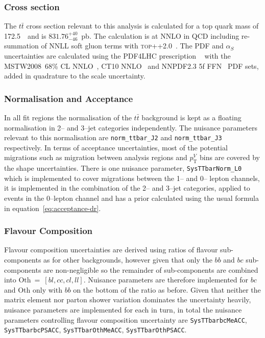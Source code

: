 \subsubsection{Cross section}

The $t\bar{t}$ cross section relevant to this analysis is calculated for a top
quark mass of 172.5~\GeV\ and is $831.76^{+40}_{-46}$~pb. The calculation is  at
NNLO in QCD including re-summation of NNLL soft gluon terms with
\textsc{top++2.0}~\cite{Beneke2012695,Cacciari2012612,PhysRevLett.109.132001,NNLOcorr,NNLOcorrNLO,PhysRevLett.110.252004,Czakon:2011xx}.
The PDF and $\alpha_S$ uncertainties are calculated using the PDF4LHC
prescription ~\cite{Botje:2011sn} with the MSTW2008~68\% CL
NNLO~\cite{PDFLHC,alphasunc}, CT10
NNLO~\cite{PhysRevD.82.074024,PhysRevD.89.033009} and NNPDF2.3 5f
FFN~\cite{Ball:2012cx} PDF sets, added in quadrature to the scale uncertainty.

\subsubsection{Normalisation and Acceptance}

In all fit regions the normalisation of the $t\bar{t}$ background is kept as a
floating normalisation in 2-- and 3--jet categories independently. The nuisance
parameters relevant to this normalisation are \texttt{norm\_ttbar\_J2} and
\texttt{norm\_ttbar\_J3} respectively. In terms of acceptance uncertainties,
most of the potential migrations such as migration between analysis regions and
$p_{\mathrm{T}}^V$ bins are covered by the shape uncertainties. There is one nuisance
parameter, \texttt{SysTTbarNorm\_L0} which is implemented to cover migrations
between the 1-- and 0-- lepton channels, it is implemented in the combination of
the 2-- and 3--jet categories, applied to events in the 0--lepton channel and
has a prior calculated using the usual formula in
equation~\ref{eq:acceptance-dr}.

\subsubsection{Flavour Composition}

Flavour composition uncertainties are derived using ratios of flavour
sub-components as for other backgrounds, however given that only the $bb$ and
$bc$ sub-components are non-negligible so the remainder of sub-components are
combined into $\text{Oth}~=~[bl, cc, cl, ll]$. Nuisance parameters are therefore
implemented for $bc$ and Oth only with $bb$ on the bottom of the ratio as
before. Given that neither the matrix element nor parton shower variation
dominates the uncertainty heavily, nuisance parameters are implemented for each
in turn, in total the nuisance parameters controlling flavour composition
uncertainty are \texttt{SysTTbarbcMeACC}, \texttt{SysTTbarbcPSACC},
\texttt{SysTTbarOthMeACC}, \texttt{SysTTbarOthPSACC}.

